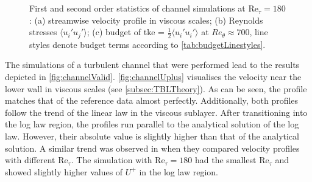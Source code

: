 \begin{figure}[h!]
\centering
\begin{subfigure}[t]{0.495\textwidth}
    \subcaption{}
    \centering
    
    \label{fig:channelUplus}
\end{subfigure}
\hfill
\begin{subfigure}[t]{0.495\textwidth}
    \centering
    \subcaption{}
    
    \label{fig:channelFluct}
\end{subfigure}
\\[-20pt]
\begin{subfigure}[t]{0.495\textwidth}
    \centering
    \subcaption{}
    
    \label{fig:channelBudgets}
\end{subfigure}
\\[-15pt]
\caption[First and second order statistics of channel simulations at $\mathrm{Re}_{\tau} = 180$]{First and second order statistics of channel simulations at $\mathrm{Re}_{\tau} = 180$: (a) streamwise velocity profile in viscous scales; (b) Reynolds stresses $\langle u_i' u_j' \rangle$; (c) budget of \acrshort{tke} = $\frac{1}{2} \langle u_i' u_i' \rangle$ at $Re_\theta \approx 700$, line styles denote budget terms according to \autoref{tab:budgetLinestyles}.}
\label{fig:channelValid}
\end{figure}

The simulations of a turbulent channel that were performed lead to the results depicted in \autoref{fig:channelValid}.
\autoref{fig:channelUplus} visualises the velocity near the lower wall in viscous scales (see \autoref{subsec:TBLTheory}).
As can be seen, the profile matches that of the reference data almost perfectly.
Additionally, both profiles follow the trend of the linear law in the viscous sublayer. 
After transitioning into the log law region, the profiles run parallel to the analytical solution of the log law.
However, their absolute value is slightly higher than that of the analytical solution.
A similar trend was observed in \citet{lee_direct_2015} when they compared velocity profiles with different $\mathrm{Re}_{\tau}$.
The simulation with $\mathrm{Re}_{\tau} = 180$ had the smallest $\mathrm{Re}_{\tau}$ and showed slightly higher values of $U^+$ in the log law region.

